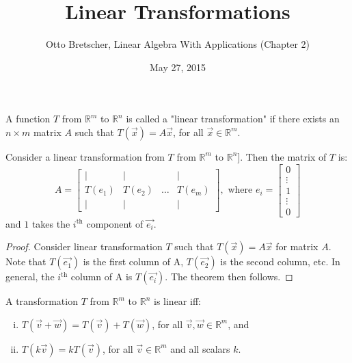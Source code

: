 \documentclass[a4paper,11pt]{article}
\title{Linear Transformations}
\author{Otto Bretscher, Linear Algebra With Applications (Chapter 2)}
\date{May 27, 2015}
\begin{document}
\maketitle
{}

\begin{outline}

    A function \(T\) from \(\mathbb{R}^m\) to \(\mathbb{R}^n\) is called a "linear transformation" if there exists 
    an \(n \times m\) matrix \(A\) such that \(T(\vec{x}) = A\vec{x}\), for all \(\vec{x} \in \mathbb{R}^m\).
    
    Consider a linear transformation from \(T\) from \(\mathbb{R}^m\) to \(\mathbb{R}^n]\). Then the matrix of \(T\) is:
    \[
      A = 
        \begin{bmatrix} 
          \vert  & \vert  &        & \vert  \\
          T(e_1) & T(e_2) & \ldots & T(e_m) \\
          \vert  & \vert  &        & \vert
        \end{bmatrix}
      ,\text{ where } e_{i} = \begin{bmatrix} 0 \\ \vdots \\ 1 \\ \vdots \\ 0 \end{bmatrix}
    \]
    and \(1\) takes the \(i^{\text{th}}\) component of \(\vec{e_i}\).
    
    \begin{proof}
      Consider linear transformation \(T\) such that \(T(\vec{x}) = A\vec{x}\) for matrix \(A\). Note that
      \(T(\vec{e_1})\) is the first column of A, \(T(\vec{e_2})\) is the second column, etc. In general, the
      \(i^{\text{th}}\) column of A is \(T(\vec{e_i})\). The theorem then follows.
    \end{proof}
    
    A transformation \(T\) from \(\mathbb{R}^m\) to \(\mathbb{R}^n\) is linear iff:
    \begin{enumerate}[i.]
      \item \(T(\vec{v} + \vec{w}) = T(\vec{v}) + T(\vec{w})\), for all \(\vec{v}, \vec{w} \in \mathbb{R}^m\), and
      \item \(T(k\vec{v}) = kT(\vec{v})\), for all \(\vec{v} \in \mathbb{R}^m\) and all scalars \(k\).
    \end{enumerate}
    

\end{outline}
\end{document}
